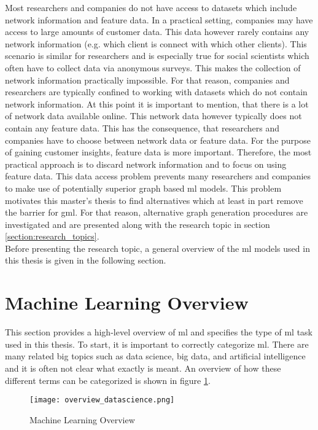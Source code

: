 	\noindent Most researchers and companies do not have access to datasets which
	include network information and feature data. In a practical setting,
	companies may have access to large amounts of customer data. This data
	however rarely contains any network information (e.g. which client is
	connect with which other clients). This scenario is similar for researchers
	and is especially true for social scientists which often have to collect 
	data via anonymous surveys. This makes the collection of network information 
	practically impossible. For that reason, companies and researchers are 
	typically confined to working with datasets which do not contain network 
	information. At this point it is important to mention, that there is a lot 
	of network data available online. This network data however typically does 
	not contain any feature data. This has the consequence, that researchers and 
	companies have to choose between network data or feature data. For the 
	purpose of gaining customer insights, feature data is more important. 
	Therefore, the most practical approach is to discard network information 
	and to focus on using feature data. This data access problem prevents many 
	researchers and companies to make use of potentially superior graph based 
	\acs{ml} models. This problem motivates this master's thesis to find
	alternatives which at least in part remove the barrier for \acs{gml}. For 
	that reason, alternative graph generation procedures are investigated and 
	are presented along with the research topic in section 
	\ref{section:research_topics}. \\

	\noindent Before presenting the research topic, a general overview of the 
	\acs{ml} models used in this thesis is given in the following section.
	
	\section{Machine Learning Overview}

	This section provides a high-level overview of \acf{ml} and
	specifies the type of \acs{ml} task used in this thesis. To start, it is 
	important to correctly categorize \acs{ml}. There are many related 
	big topics such as data science, big data, and artificial intelligence and 
	it is often not clear what exactly is meant. An overview of how these 
	different terms can be categorized is shown in figure \ref{fig:ml_overview}.

	\begin{figure}[H]
		\centering
		\texttt{[image: overview\_datascience.png]}
		\caption{Machine Learning Overview}
		\citep{Frauenhofer2021}
		\label{fig:ml_overview}
	\end{figure} 

